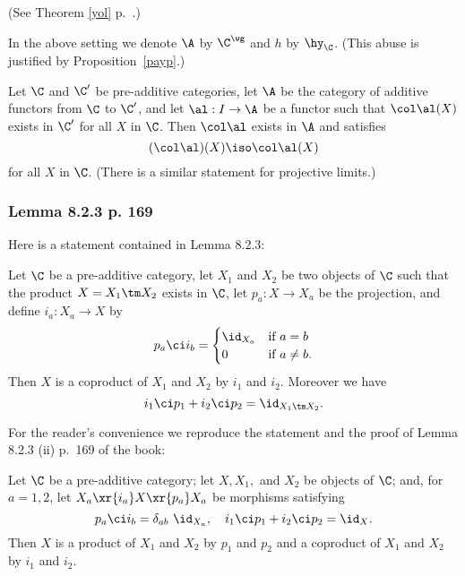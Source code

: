 \documentclass[12pt]{article}
\theoremstyle{remark}
\theoremstyle{definition}
\begin{document}
\nn(See Theorem \ref{yol} p.~.)

\begin{conv}
In the above setting we denote $\A$ by $\C^\wg$ and $h$ by $\hy_\C$. (This abuse is justified by Proposition~\ref{payp}.) 
\end{conv} 

\begin{lem} 
Let $\C$ and $\C'$ be pre-additive categories, let $\A$ be the category of additive functors from $\C$ to $\C'$, and let $\al:I\to\A$ be a functor such that $\col\al(X)$ exists in $\C'$ for all $X$ in $\C$. Then $\col\al$ exists in $\A$ and satisfies 
$$
(\col\al)(X)\iso\col\al(X)
$$ 
for all $X$ in $\C$. (There is a similar statement for projective limits.)
\end{lem} 


\subsubsection{Lemma 8.2.3 p. 169} 

Here is a statement contained in Lemma 8.2.3: 

\begin{cor} 
Let $\C$ be a pre-additive category, let $X_1$ and $X_2$ be two objects of $\C$ such that the product $X=X_1\tm X_2$ exists in $\C$, let $p_a:X\to X_a$ be the projection, and define $i_a:X_a\to X$ by 
$$
p_a\ci i_b=\begin{cases}\id_{X_a}&\text{if }a=b\\0&\text{if }a\not=b.\end{cases}
$$ 
Then $X$ is a coproduct of $X_1$ and $X_2$ by $i_1$ and $i_2$. Moreover we have 
$$
i_1\ci p_1+i_2\ci p_2=\id_{X_1\tm X_2}.
$$
\end{cor}

For the reader's convenience we reproduce the statement and the proof of Lemma 8.2.3 (ii) p.~169 of the book:

\begin{lem}[Lemma 8.2.3 (ii) p. 169]
Let $\C$ be a pre-additive category; let $X,X_1,$ and $X_2$ be objects of $\C$; and, for $a=1,2$, let $X_a\xr{i_a}X\xr{p_a}X_a$ be morphisms satisfying 
$$
p_a\ci i_b=\delta_{ab}\ \id_{X_a},\quad i_1\ci p_1+i_2\ci p_2=\id_X.
$$
Then $X$ is a product of $X_1$ and $X_2$ by $p_1$ and $p_2$ and a coproduct of $X_1$ and $X_2$ by $i_1$ and $i_2$. 
\end{lem}
\end{document}
